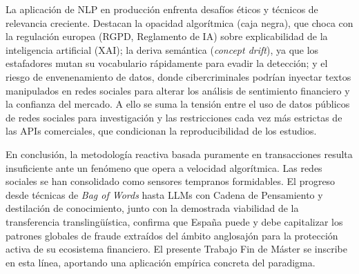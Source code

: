 La aplicación de NLP en producción enfrenta desafíos éticos y técnicos de relevancia creciente. Destacan la opacidad algorítmica (caja negra), que choca con la regulación europea (RGPD, Reglamento de IA) sobre explicabilidad de la inteligencia artificial (XAI); la deriva semántica (\textit{concept drift}), ya que los estafadores mutan su vocabulario rápidamente para evadir la detección; y el riesgo de envenenamiento de datos, donde cibercriminales podrían inyectar textos manipulados en redes sociales para alterar los análisis de sentimiento financiero y la confianza del mercado. A ello se suma la tensión entre el uso de datos públicos de redes sociales para investigación y las restricciones cada vez más estrictas de las APIs comerciales, que condicionan la reproducibilidad de los estudios.

En conclusión, la metodología reactiva basada puramente en transacciones resulta insuficiente ante un fenómeno que opera a velocidad algorítmica. Las redes sociales se han consolidado como sensores tempranos formidables. El progreso desde técnicas de \textit{Bag of Words} hasta LLMs con Cadena de Pensamiento y destilación de conocimiento, junto con la demostrada viabilidad de la transferencia translingüística, confirma que España puede y debe capitalizar los patrones globales de fraude extraídos del ámbito anglosajón para la protección activa de su ecosistema financiero. El presente Trabajo Fin de Máster se inscribe en esta línea, aportando una aplicación empírica concreta del paradigma.
